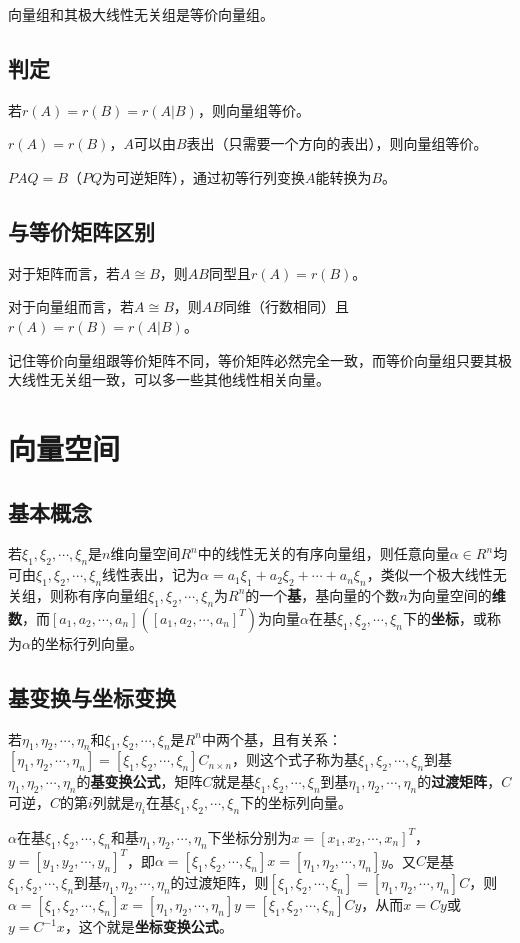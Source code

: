 \documentclass[UTF8, 12pt]{ctexart}
\begin{document}
向量组和其极大线性无关组是等价向量组。

\subsection{判定}

若$r(A)=r(B)=r(A|B)$，则向量组等价。

$r(A)=r(B)$，$A$可以由$B$表出（只需要一个方向的表出），则向量组等价。

$PAQ=B$（$PQ$为可逆矩阵），通过初等行列变换$A$能转换为$B$。

\subsection{与等价矩阵区别}

对于矩阵而言，若$A\cong B$，则$AB$同型且$r(A)=r(B)$。

对于向量组而言，若$A\cong B$，则$AB$同维（行数相同）且$r(A)=r(B)=r(A|B)$。

记住等价向量组跟等价矩阵不同，等价矩阵必然完全一致，而等价向量组只要其极大线性无关组一致，可以多一些其他线性相关向量。

\section{向量空间}

\subsection{基本概念}

若$\xi_1,\xi_2,\cdots,\xi_n$是$n$维向量空间$R^n$中的线性无关的有序向量组，则任意向量$\alpha\in R^n$均可由$\xi_1,\xi_2,\cdots,\xi_n$线性表出，记为$\alpha=a_1\xi_1+a_2\xi_2+\cdots+a_n\xi_n$，类似一个极大线性无关组，则称有序向量组$\xi_1,\xi_2,\cdots,\xi_n$为$R^n$的一个\textbf{基}，基向量的个数$n$为向量空间的\textbf{维数}，而$[a_1,a_2,\cdots,a_n]([a_1,a_2,\cdots,a_n]^T)$为向量$\alpha$在基$\xi_1,\xi_2,\cdots,\xi_n$下的\textbf{坐标}，或称为$\alpha$的坐标行列向量。

\subsection{基变换与坐标变换}

若$\eta_1,\eta_2,\cdots,\eta_n$和$\xi_1,\xi_2,\cdots,\xi_n$是$R^n$中两个基，且有关系：$[\eta_1,\eta_2,\cdots,\eta_n]=[\xi_1,\xi_2,\cdots,\xi_n]C_{n\times n}$，则这个式子称为基$\xi_1,\xi_2,\cdots,\xi_n$到基$\eta_1,\eta_2,\cdots,\eta_n$的\textbf{基变换公式}，矩阵$C$就是基$\xi_1,\xi_2,\cdots,\xi_n$到基$\eta_1,\eta_2,\cdots,\eta_n$的\textbf{过渡矩阵}，$C$可逆，$C$的第$i$列就是$\eta_i$在基$\xi_1,\xi_2,\cdots,\xi_n$下的坐标列向量。

$\alpha$在基$\xi_1,\xi_2,\cdots,\xi_n$和基$\eta_1,\eta_2,\cdots,\eta_n$下坐标分别为$x=[x_1,x_2,\cdots,x_n]^T$，$y=[y_1,y_2,\cdots,y_n]^T$，即$\alpha=[\xi_1,\xi_2,\cdots,\xi_n]x=[\eta_1,\eta_2,\cdots,\eta_n]y$。又$C$是基$\xi_1,\xi_2,\cdots,\xi_n$到基$\eta_1,\eta_2,\cdots,\eta_n$的过渡矩阵，则$[\xi_1,\xi_2,\cdots,\xi_n]=[\eta_1,\eta_2,\cdots,\eta_n]C$，则$\alpha=[\xi_1,\xi_2,\cdots,\xi_n]x=[\eta_1,\eta_2,\cdots,\eta_n]y=[\xi_1,\xi_2,\cdots,\xi_n]Cy$，从而$x=Cy$或$y=C^{-1}x$，这个就是\textbf{坐标变换公式}。
\end{document}
